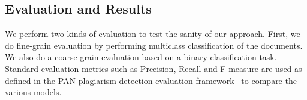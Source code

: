 \documentclass[11pt]{article}
\begin{document}

\subsection{Evaluation and Results}
We perform two kinds of evaluation to test the sanity of our approach. First, we do fine-grain evaluation by performing multiclass classification of the documents. We also do a coarse-grain evaluation based on a binary classification task. Standard evaluation metrics such as Precision, Recall and F-measure are used as defined in the PAN plagiarism detection evaluation framework~\cite{pot:10} to compare the various models.
\end{document}

